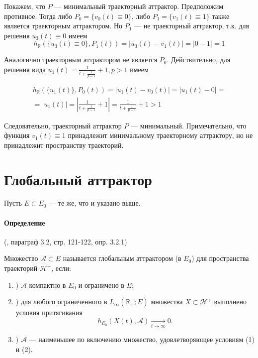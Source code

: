 Покажем, что $P$ --- минимальный траекторный аттрактор.
Предположим противное.
Тогда либо $P_0 =\{v_0(t) \equiv 0\}$, либо $P_1 =\{v_1(t) \equiv 1\}$ также является траекторным аттрактором.
Но $P_1$ --- не траекторный аттрактор, т.к. для решения $u_3(t) \equiv 0$ имеем
\begin{equation}
	h_{\mathbb{R}}(\{u_3(t) \equiv 0 \},P_1(t)) =
	|u_3(t) - v_1(t)| =
	|0-1| =
	1
\end{equation}

Аналогично траекторным аттрактором не является $P_0$.
Действительно, для решения вида $u_1(t)=\frac{1}{t+\frac{1}{p-1}}+1, p > 1$ имеем

\begin{multline}
	h_{\mathbb{R}}(\{u_1(t)\},P_0(t)) =
	|u_1(t) - v_0(t)| =
	|u_1(t) - 0| =
	\\ =
	|u_1(t)| =
	\left| \frac{1}{t+\frac{1}{p-1}}+1 \right| =
	\frac{1}{t+\frac{1}{p-1}}+1 >	1
\end{multline}

Следовательно, траекторный аттрактор $P$ --- минимальный.
Примечательно, что функция $v_1(t) \equiv 1$ принадлежит минимальному траекторному аттрактору,
но не принадлежит пространству траекторий.


\section{Глобальный аттрактор}

Пусть $E\subset E_0$ --- те же, что и указано выше.

\paragraph{Определение} (\cite{Zelenaya}, параграф 3.2, стр. 121-122, опр. 3.2.1)

Множество  $\mathcal{A} \subset E $ называется глобальным аттрактором (в $E_0$) для пространства траекторий $\mathcal{H}^+$, если:
\begin{enumerate}
	\item)
		$\mathcal{A}$ компактно в $E_0$ и ограничено в $E$;
	\item)
		для любого ограниченного в $L_\infty(\mathbb{R}_+; E)$ множества $X \subset \mathcal{H}^+$
		выполнено условия притягивания
		$$
			h_{E_0}(X(t),\mathcal{A}) \xrightarrow[t\to \infty]{}{0}.
		$$
	\item)
		$\mathcal{A}$ --- наименьшее по включению множество, удовлетворяющее условиям (1) и (2).
\end{enumerate}


